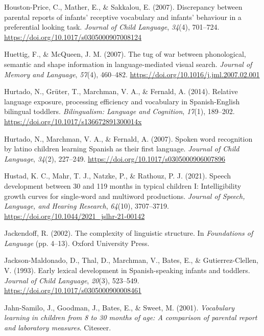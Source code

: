 \documentclass[
  12pt,
  b5paperpaper,
  twoside]{scrreprt}
\newlength{\cslhangindent}
\newlength{\cslentryspacingunit} %
\newenvironment{CSLReferences}[2] %
 {%
  \setlength{\parindent}{0pt}
  \ifodd #1
  \let\oldpar\par
  \def\par{\hangindent=\cslhangindent\oldpar}
  \fi
  \setlength{\parskip}{#2\cslentryspacingunit}
 }%
 {}
\begin{document}
\begin{CSLReferences}{1}{0}
\leavevmode{}%
Houston-Price, C., Mather, E., \& Sakkalou, E. (2007). Discrepancy
between parental reports of infants' receptive vocabulary and infants'
behaviour in a preferential looking task. \emph{Journal of Child
Language}, \emph{34}(4), 701--724.
\url{https://doi.org/10.1017/s0305000907008124}

\leavevmode{}%
Huettig, F., \& McQueen, J. M. (2007). The tug of war between
phonological, semantic and shape information in language-mediated visual
search. \emph{Journal of Memory and Language}, \emph{57}(4), 460--482.
\url{https://doi.org/10.1016/j.jml.2007.02.001}

\leavevmode{}%
Hurtado, N., Grüter, T., Marchman, V. A., \& Fernald, A. (2014).
Relative language exposure, processing efficiency and vocabulary in
{Spanish-English} bilingual toddlers. \emph{Bilingualism: Language and
Cognition}, \emph{17}(1), 189--202.
\url{https://doi.org/10.1017/s136672891300014x}

\leavevmode{}%
Hurtado, N., Marchman, V. A., \& Fernald, A. (2007). Spoken word
recognition by latino children learning {Spanish} as their first
language. \emph{Journal of Child Language}, \emph{34}(2), 227--249.
\url{https://doi.org/10.1017/s0305000906007896}

\leavevmode{}%
Hustad, K. C., Mahr, T. J., Natzke, P., \& Rathouz, P. J. (2021). Speech
development between 30 and 119 months in typical children {I}:
Intelligibility growth curves for single-word and multiword productions.
\emph{Journal of Speech, Language, and Hearing Research}, \emph{64}(10),
3707--3719. \url{https://doi.org/10.1044/2021_jslhr-21-00142}

\leavevmode{}%
Jackendoff, R. (2002). The complexity of linguistic structure. In
\emph{Foundations of {Language}} (pp. 4--13). {Oxford University Press}.

\leavevmode{}%
Jackson-Maldonado, D., Thal, D., Marchman, V., Bates, E., \&
Gutierrez-Clellen, V. (1993). Early lexical development in
{Spanish-speaking} infants and toddlers. \emph{Journal of Child
Language}, \emph{20}(3), 523--549.
\url{https://doi.org/10.1017/s0305000900008461}

\leavevmode{}%
Jahn-Samilo, J., Goodman, J., Bates, E., \& Sweet, M. (2001).
\emph{Vocabulary learning in children from 8 to 30 months of age: A
comparison of parental report and laboratory measures}. {Citeseer}.


\end{CSLReferences}
\end{document}
